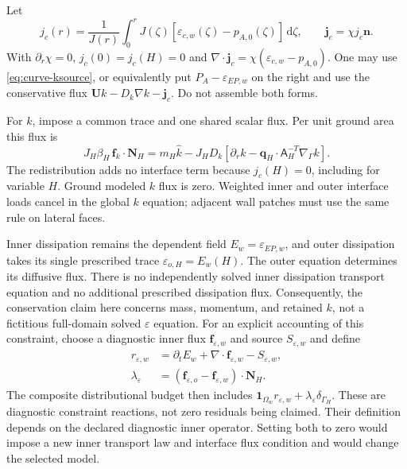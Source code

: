 \documentclass[11pt,a4paper]{article}
\numberwithin{equation}{section}
\newcommand{\dd}{\mathrm{d}}
\newcommand{\eps}{\varepsilon}
\newcommand{\ECw}{\eps_{c,w}}
\newcommand{\EEP}{\eps_{EP,w}}
\begin{document}
Let
\begin{equation}
 j_c(r)=\frac1{J(r)}\int_0^rJ(\zeta)
       [\ECw(\zeta)-p_{A,0}(\zeta)]\,\dd\zeta,
 \qquad \bm j_c=\chi j_c\bm n.
 \label{eq:curve-redistribution}
\end{equation}
With $\partial_r\chi=0$, $j_c(0)=j_c(H)=0$ and
$\nabla\cdot\bm j_c=\chi(\ECw-p_{A,0})$. One may use
\cref{eq:curve-ksource}, or equivalently put $P_A-\EEP$ on the
right and use the conservative flux
$\bm U k-D_k\nabla k-\bm j_c$. Do not assemble both forms.

For $k$, impose a common trace and one shared scalar flux. Per unit
ground area this flux is
\begin{equation}
 \boxed{J_H\beta_H\,\bm f_k\cdot\bm N_H
 =m_H\widehat k-J_HD_k\left[
 \partial_r k-\bm q_H\cdot \mathsf A_H^{-T}\nabla_\Gamma k\right].}
 \label{eq:curve-k-interface}
\end{equation}
The redistribution adds no interface term because $j_c(H)=0$,
including for variable $H$. Ground modeled $k$ flux is zero.
Weighted inner and outer interface loads cancel in the global $k$
equation; adjacent wall patches must use the same rule on lateral faces.

Inner dissipation remains the dependent field
$E_w=\EEP$, and outer dissipation takes its single prescribed trace
$\eps_{o,H}=E_w(H)$. The outer equation determines its diffusive
flux. There is no independently solved inner dissipation transport
equation and no additional prescribed dissipation flux. Consequently,
the conservation claim here concerns mass, momentum, and retained
$k$, not a fictitious full-domain solved $\eps$ equation.
For an explicit accounting of this constraint, choose a diagnostic
inner flux $\bm f_{\eps,w}$ and source $S_{\eps,w}$ and define
\begin{equation}
 \begin{aligned}
 r_{\eps,w}&=\partial_tE_w+\nabla\cdot\bm f_{\eps,w}-S_{\eps,w},\\
 \lambda_\eps&=(\bm f_{\eps,o}-\bm f_{\eps,w})\cdot\bm N_H.
 \end{aligned}
 \label{eq:curve-epsilon-reaction}
\end{equation}
The composite distributional budget then includes
$\bm1_{\Omega_w}r_{\eps,w}+\lambda_\eps\delta_{\Gamma_H}$.
These are diagnostic constraint reactions, not zero residuals being
claimed. Their definition depends on the declared diagnostic inner
operator. Setting both to zero would impose a new inner transport
law and interface flux condition and would change the selected model.
\end{document}
